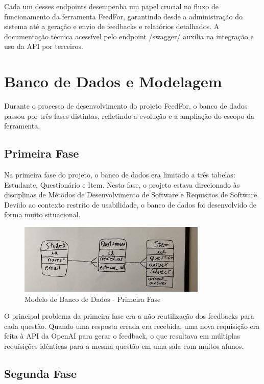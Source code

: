 Cada um desses endpoints desempenha um papel crucial no fluxo de funcionamento da ferramenta FeedFor, garantindo desde a administração do sistema até a geração e envio de feedbacks e relatórios detalhados. A documentação técnica acessível pelo endpoint /swagger/ auxilia na integração e uso da API por terceiros.

\section{Banco de Dados e Modelagem}

Durante o processo de desenvolvimento do projeto FeedFor, o banco de dados passou por três fases distintas, refletindo a evolução e a ampliação do escopo da ferramenta.

\subsection{Primeira Fase}

Na primeira fase do projeto, o banco de dados era limitado a três tabelas: Estudante, Questionário e Item. Nesta fase, o projeto estava direcionado às disciplinas de Métodos de Desenvolvimento de Software e Requisitos de Software. Devido ao contexto restrito de usabilidade, o banco de dados foi desenvolvido de forma muito situacional.

\begin{figure}[H]
    \centering
    \includegraphics[width=0.8\textwidth]{figuras/bd-phase1.jpeg}
    \caption{Modelo de Banco de Dados - Primeira Fase}
    \label{fig:first_phase}
\end{figure}

O principal problema da primeira fase era a não reutilização dos feedbacks para cada questão. Quando uma resposta errada era recebida, uma nova requisição era feita à API da OpenAI para gerar o feedback, o que resultava em múltiplas requisições idênticas para a mesma questão em uma sala com muitos alunos.

\subsection{Segunda Fase}

